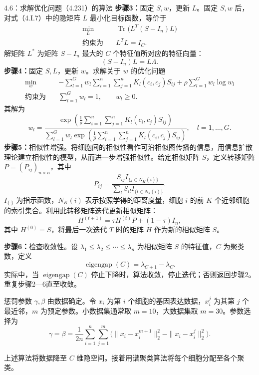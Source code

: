 \begin{bookalgorithm}{4.6：求解优化问题（4.231）的算法}
\textbf{步骤3：}固定 $S,w$，更新 $L$。固定 $S,w$ 后，对式（4.I.7）中的隐矩阵 $L$ 最小化目标函数，等价于
\begin{equation}
\begin{aligned}
\min_L\quad &\operatorname{Tr}\bigl(L^T(S-I_n)L\bigr)\\
\text{约束为}\quad &L^TL=I_C.
\end{aligned}\tag{4.236}
\end{equation}
解矩阵 $L^*$ 为矩阵 $S-I_n$ 最大的 $C$ 个特征值所对应的特征向量：
\[
(S-I_n)L=L\Lambda.
\]
\textbf{步骤4：}固定 $S,L$，更新 $w$。求解关于 $w$ 的优化问题
\begin{equation}
\begin{aligned}
\min_w\quad
 &-\sum_{l=1}^{G}w_l\sum_{i=1}^{n}\sum_{j=1}^{n}K_l(c_i,c_j)S_{ij}
 +\rho\sum_{l=1}^{G}w_l\log w_l\\
\text{约束为}\quad&\sum_{l=1}^{G}w_l=1,\qquad w_l\ge0.
\end{aligned}\tag{4.237}
\end{equation}
其解为
\begin{equation}
w_l=\frac{
\exp\left(\frac1\rho\sum_{i=1}^{n}\sum_{j=1}^{n}K_l(c_i,c_j)S_{ij}\right)}{
\sum_{l=1}^{G}w_l\exp\left(\frac1\rho\sum_{i=1}^{n}\sum_{j=1}^{n}K_l(c_i,c_j)S_{ij}\right)},
\quad l=1,\ldots,G.\tag{4.238}
\end{equation}
\textbf{步骤5：}相似性增强。将细胞间的相似性看作可沿相似图传播的信息，用信息扩散理论建立相似性的模型，从而进一步增强相似性。给定相似矩阵 $S$，定义转移矩阵 $P=(P_{ij})_{n\times n}$，其中
\[
P_{ij}=\frac{S_{ij}I_{\{j\in N_K(i)\}}}{\sum_lS_{il}I_{\{l\in N_k(i)\}}}.
\]
$I_{\{\cdot\}}$ 为指示函数，$N_K(i)$ 表示按照学得的距离度量，细胞 $i$ 的前 $K$ 个近邻细胞的索引集合。利用此转移矩阵迭代更新相似矩阵：
\[
H^{(t+1)}=\tau H^{(t)}P+(1-\tau)I_n,
\]
其中 $H^{(0)}=S$，将最后一次迭代 $T$ 时的矩阵 $H$ 作为新的相似矩阵 $S$。

\textbf{步骤6：}检查收敛性。设 $\lambda_1\le\lambda_2\le\cdots\le\lambda_n$ 为相似矩阵 $S$ 的特征值，$C$ 为聚类数，定义
\[
\operatorname{eigengap}(C)=\lambda_{C+1}-\lambda_C.
\]
实际中，当 $\operatorname{eigengap}(C)$ 停止下降时，算法收敛，停止迭代；否则返回步骤2。重复步骤2—6直至收敛。

惩罚参数 $\gamma,\beta$ 由数据确定。令 $x_i$ 为第 $i$ 个细胞的基因表达数据，$x_i^j$ 为其第 $j$ 个最近邻，$m$ 为预定参数。小数据集通常取 $m=10$，大数据集取 $m=30$。参数选择为
\[
\gamma=\beta=\frac{1}{2n}\sum_{i=1}^{n}\sum_{j=1}^{m}
\bigl(\|x_i-x_i^{m+1}\|_2^2-\|x_i-x_i^j\|_2^2\bigr).
\]
\end{bookalgorithm}
上述算法将数据降至 $C$ 维隐空间。接着用谱聚类算法将每个细胞分配至各个聚类。

